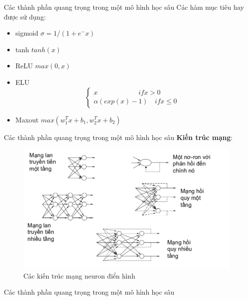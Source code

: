 \documentclass[compress]{beamer}
\begin{document}
\begin{frame}{Các thành phần quang trọng trong một mô hình học sâu} 
Các hàm mục tiêu hay được sử dụng: \begin{itemize}
\item sigmoid $\sigma =1/(1+e^-x)$
\item tanh $ tanh(x)$
\item ReLU $ max(0,x)$
\item ELU \abovedisplayskip=0pt\relax
\begin{equation}
\begin{cases}
x \qquad \qquad \qquad  if x>0\\ \alpha (exp(x)-1) \quad if x \leq 0
\end{cases}
\end{equation}
\item Maxout $max(w_1^T x+b_1,w_2^T x+b_2) $

\end{itemize}

\end{frame}
\begin{frame}{Các thành phần quang trọng trong một mô hình học sâu}
\textbf{Kiến trúc mạng}:
\begin{figure}[H]
\includegraphics[scale=0.3]{archneuron.png}
\caption{Các kiến trúc mạng neuron điển hình}
\end{figure}
\end{frame}
\begin{frame}{Các thành phần quang trọng trong một mô hình học sâu}
\\

\end{frame}
\end{document}
